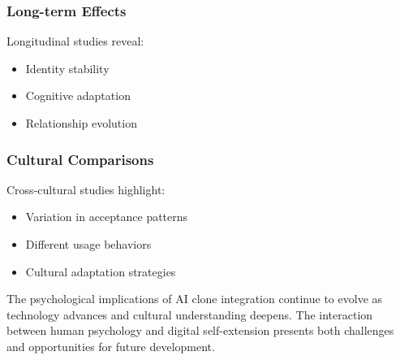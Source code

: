 \subsubsection{Long-term Effects}
Longitudinal studies reveal:
\begin{itemize}
\item Identity stability
\item Cognitive adaptation
\item Relationship evolution
\end{itemize}

\subsubsection{Cultural Comparisons}
Cross-cultural studies highlight:
\begin{itemize}
\item Variation in acceptance patterns
\item Different usage behaviors
\item Cultural adaptation strategies
\end{itemize}

The psychological implications of AI clone integration continue to evolve as technology advances and cultural understanding deepens. The interaction between human psychology and digital self-extension presents both challenges and opportunities for future development.
